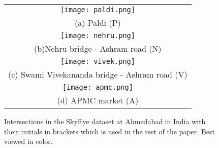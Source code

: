 \documentclass[final,journal]{IEEEtran}
\begin{document}
\begin{figure}
    \centering
    \begin{tabular}{c}
      \texttt{[image: paldi.png]} \\
      (a) Paldi (P)\\
      \texttt{[image: nehru.png]} \\
      (b)Nehru bridge - Ashram road (N) \\
      \texttt{[image: vivek.png]} \\
      (c) Swami Vivekananda bridge - Ashram road (V)\\
      \texttt{[image: apmc.png]} \\
      (d) APMC market (A)\\
    \end{tabular}
    \caption{Intersections in the SkyEye dataset at Ahmedabad in India with their initials in brackets which is used in the rest of the paper. Best viewed in color.}
    \label{intersections}
\end{figure}
\end{document}
